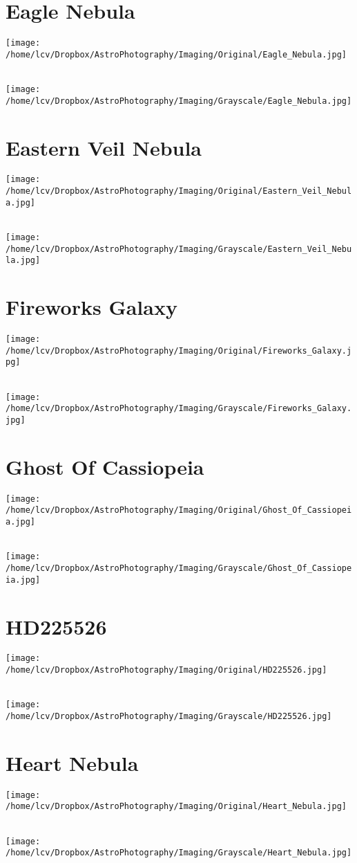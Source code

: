 \section{Eagle Nebula}
\texttt{[image: /home/lcv/Dropbox/AstroPhotography/Imaging/Original/Eagle\_Nebula.jpg]}
{\footnotesize\color{white}

}\ \\
\texttt{[image: /home/lcv/Dropbox/AstroPhotography/Imaging/Grayscale/Eagle\_Nebula.jpg]}
\section{Eastern Veil Nebula}
\texttt{[image: /home/lcv/Dropbox/AstroPhotography/Imaging/Original/Eastern\_Veil\_Nebula.jpg]}
{\footnotesize\color{white}

}\ \\
\texttt{[image: /home/lcv/Dropbox/AstroPhotography/Imaging/Grayscale/Eastern\_Veil\_Nebula.jpg]}
\section{Fireworks Galaxy}
\texttt{[image: /home/lcv/Dropbox/AstroPhotography/Imaging/Original/Fireworks\_Galaxy.jpg]}
{\footnotesize\color{white}

}\ \\
\texttt{[image: /home/lcv/Dropbox/AstroPhotography/Imaging/Grayscale/Fireworks\_Galaxy.jpg]}
\section{Ghost Of Cassiopeia}
\texttt{[image: /home/lcv/Dropbox/AstroPhotography/Imaging/Original/Ghost\_Of\_Cassiopeia.jpg]}
{\footnotesize\color{white}

}\ \\
\texttt{[image: /home/lcv/Dropbox/AstroPhotography/Imaging/Grayscale/Ghost\_Of\_Cassiopeia.jpg]}
\section{HD225526}
\texttt{[image: /home/lcv/Dropbox/AstroPhotography/Imaging/Original/HD225526.jpg]}
{\footnotesize\color{white}

}\ \\
\texttt{[image: /home/lcv/Dropbox/AstroPhotography/Imaging/Grayscale/HD225526.jpg]}
\section{Heart Nebula}
\texttt{[image: /home/lcv/Dropbox/AstroPhotography/Imaging/Original/Heart\_Nebula.jpg]}
{\footnotesize\color{white}

}\ \\
\texttt{[image: /home/lcv/Dropbox/AstroPhotography/Imaging/Grayscale/Heart\_Nebula.jpg]}
